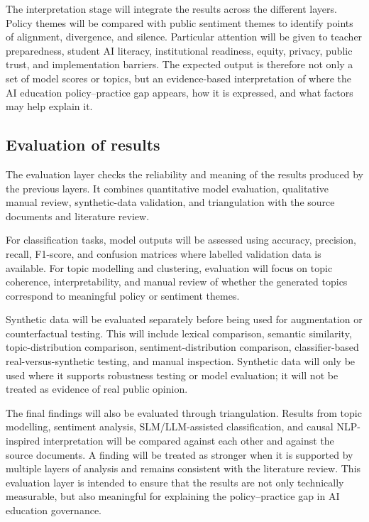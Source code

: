 \documentclass{article}
\begin{document}
The interpretation stage will integrate the results across the different layers.
Policy themes will be compared with public sentiment themes to identify points
of alignment, divergence, and silence. Particular attention will be given to
teacher preparedness, student AI literacy, institutional readiness, equity,
privacy, public trust, and implementation barriers. The expected output is
therefore not only a set of model scores or topics, but an evidence-based
interpretation of where the AI education policy--practice gap appears, how it is
expressed, and what factors may help explain it.

\subsection{Evaluation of results}

The evaluation layer checks the reliability and meaning of the results produced
by the previous layers. It combines quantitative model evaluation, qualitative
manual review, synthetic-data validation, and triangulation with the source
documents and literature review.

For classification tasks, model outputs will be assessed using accuracy,
precision, recall, F1-score, and confusion matrices where labelled validation
data is available. For topic modelling and clustering, evaluation will focus on
topic coherence, interpretability, and manual review of whether the generated
topics correspond to meaningful policy or sentiment themes.

Synthetic data will be evaluated separately before being used for augmentation
or counterfactual testing. This will include lexical comparison, semantic
similarity, topic-distribution comparison, sentiment-distribution comparison,
classifier-based real-versus-synthetic testing, and manual inspection. Synthetic
data will only be used where it supports robustness testing or model evaluation;
it will not be treated as evidence of real public opinion.

The final findings will also be evaluated through triangulation. Results from
topic modelling, sentiment analysis, SLM/LLM-assisted classification, and causal
NLP-inspired interpretation will be compared against each other and against the
source documents. A finding will be treated as stronger when it is supported by
multiple layers of analysis and remains consistent with the literature review.
This evaluation layer is intended to ensure that the results are not only
technically measurable, but also meaningful for explaining the policy--practice
gap in AI education governance.
\end{document}
